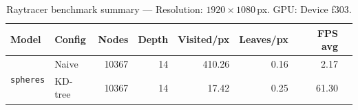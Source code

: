 
\begin{table}[htbp]
  \centering\small
  \setlength{\tabcolsep}{4pt}
  \caption{Raytracer benchmark summary --- Resolution: $1920\times1080$\,px. GPU: Device f303.}
  \label{tab:rt-summary}
  \begin{tabular}{@{}llrrrrrr@{}}
    \toprule
    \textbf{Model} & \textbf{Config} & \textbf{Nodes} & \textbf{Depth} & \textbf{Visited/px} & \textbf{Leaves/px} & \textbf{FPS avg} \\
    \midrule
    \multirow{2}{*}{\texttt{spheres}} & Naive & 10367 & 14 & 410.26 & 0.16 & 2.17 \\
     & KD-tree & 10367 & 14 & 17.42 & 0.25 & 61.30 \\
    \bottomrule
  \end{tabular}
\end{table}
